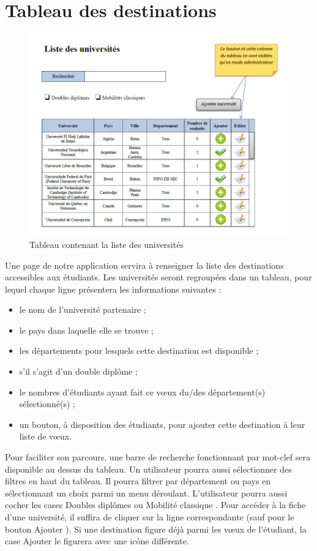\section{Tableau des destinations}
\label{sec::list_univ}

\begin{figure}[h!]
	\centering
	\includegraphics[scale=0.7]{Universites/listeUnivs.png}
	\caption{Tableau contenant la liste des universités}
\end{figure}



Une page de notre application servira à renseigner la liste des destinations accessibles aux étudiants.
Les universités seront regroupées dans un tableau, pour lequel chaque ligne présentera les informations suivantes :
 \begin{itemize}
 	\item le nom de l'université partenaire ;
 	\item le pays dans laquelle elle se trouve ;
 	\item les départements pour lesquels cette destination est disponible ;
 	\item s'il s'agit d'un double diplôme ;
 	\item le nombres d'étudiants ayant fait ce vœux du/des département(s) sélectionné(s) ;
 	\item un bouton, à disposition des étudiants, pour ajouter cette destination à leur liste de vœux.
 \end{itemize}
 
Pour faciliter son parcours, une barre de recherche fonctionnant par mot-clef sera disponible au dessus du tableau. Un utilisateur pourra aussi sélectionner des filtres en haut du tableau. Il pourra filtrer par département ou pays en sélectionnant un choix parmi un menu déroulant. L'utilisateur pourra aussi cocher les cases \og Doubles diplômes\fg{} ou \og Mobilité classique \fg{}. Pour accéder à la fiche d'une université, il suffira de cliquer sur la ligne correspondante (sauf pour le bouton \og Ajouter \fg{}). Si une destination figure déjà parmi les vœux de l'étudiant, la case \og Ajouter \fg{} le figurera avec une icône différente.

